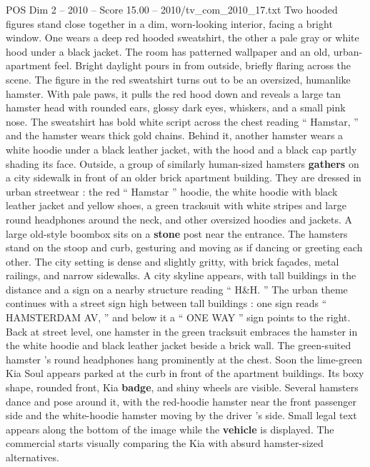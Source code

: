 \begin{textsample}{POS Dim 2 – 2010 – Score 15.00 – 2010/tv\_com\_2010\_17.txt}  \label{ex:f2_pos_053}
Two hooded figures stand close together in a dim, worn-looking interior, facing a bright window.
One wears a deep red hooded sweatshirt, the other a pale gray or white hood under a black jacket.
The room has patterned wallpaper and an old, urban-apartment feel.
Bright daylight pours in from outside, briefly flaring across the scene.
The figure in the red sweatshirt turns out to be an oversized, humanlike hamster.
With pale paws, it pulls the red hood down and reveals a large tan hamster head with rounded ears, glossy dark eyes, whiskers, and a small pink nose.
The sweatshirt has bold white script across the chest reading “ Hamstar, ” and the hamster wears thick gold chains.
Behind it, another hamster wears a white hoodie under a black leather jacket, with the hood and a black cap partly shading its face.
Outside, a group of similarly human-sized hamsters \textbf{gathers} on a city sidewalk in front of an older brick apartment building.
They are dressed in urban streetwear : the red “ Hamstar ” hoodie, the white hoodie with black leather jacket and yellow shoes, a green tracksuit with white stripes and large round headphones around the neck, and other oversized hoodies and jackets.
A large old-style boombox sits on a \textbf{stone} post near the entrance.
The hamsters stand on the stoop and curb, gesturing and moving as if dancing or greeting each other.
The city setting is dense and slightly gritty, with brick façades, metal railings, and narrow sidewalks.
A city skyline appears, with tall buildings in the distance and a sign on a nearby structure reading “ H\&H. ” The urban theme continues with a street sign high between tall buildings : one sign reads “ HAMSTERDAM AV, ” and below it a “ ONE WAY ” sign points to the right.
Back at street level, one hamster in the green tracksuit embraces the hamster in the white hoodie and black leather jacket beside a brick wall.
The green-suited hamster ’s round headphones hang prominently at the chest.
Soon the lime-green Kia Soul appears parked at the curb in front of the apartment buildings.
Its boxy shape, rounded front, Kia \textbf{badge}, and shiny wheels are visible.
Several hamsters dance and pose around it, with the red-hoodie hamster near the front passenger side and the white-hoodie hamster moving by the driver ’s side.
Small legal text appears along the bottom of the image while the \textbf{vehicle} is displayed.
The commercial starts visually comparing the Kia with absurd hamster-sized alternatives.

\end{textsample}
